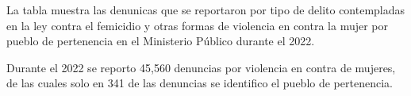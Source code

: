 La tabla muestra las denunicas que se reportaron por tipo de delito contempladas en la ley contra el femicidio y otras formas de violencia en contra la mujer por pueblo de pertenencia en el Ministerio Público durante el 2022. 

Durante el 2022 se reporto 45,560 denuncias por violencia en contra de mujeres, de las cuales solo en 341 de las denuncias se identifico el pueblo de pertenencia.

